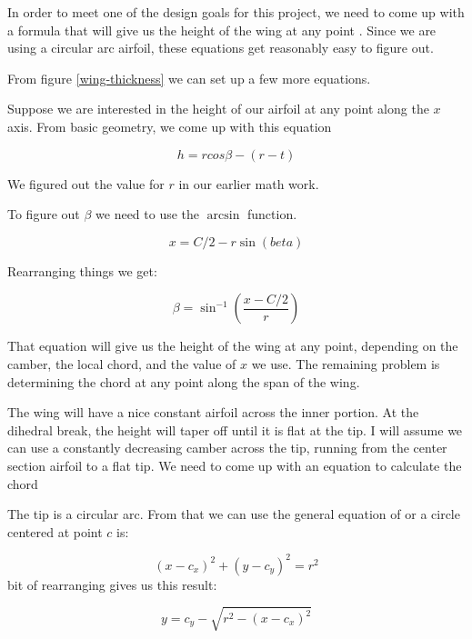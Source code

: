 In order to meet one of the design goals for this project, we need to come up
with a formula that will give us the height of the wing at any point . Since we
are using a circular arc airfoil, these equations get reasonably easy to figure
out.


From figure \ref{wing-thickness} we can set up a few more equations.


Suppose we are interested in the height of our airfoil at any point along the
{$x$} axis. From basic geometry, we come up with this equation

\begin{equation}
  h = r cos{\beta} - ( r - t )
\end{equation}

We figured out the value for {$r$} in our earlier math work.


To figure out {$\beta$} we need to use the $\arcsin$ function.

\begin{equation}
  x = C / 2 - r \sin(beta)
\end{equation}

Rearranging things we get:

\begin{equation}
  \beta = \sin^{-1} ( \frac{x - C/2}{r} )
\end{equation}

That equation will give us the height of the wing at any point, depending on
the camber, the local chord, and the value of {$x$} we use. The remaining
problem is determining the chord at any point along the span of the wing.

The wing will have a nice constant airfoil across the inner portion. At the
dihedral break, the height will taper off until it is flat at the tip. I will
assume we can use a constantly decreasing camber across the tip, running from
the center section airfoil to a flat tip. We need to come up with an equation
to calculate the chord

The tip is a circular arc. From that we can use the general equation of or a
circle centered at point {$c$} is:

\begin{equation}
  {(x - c_x)}^2 + {(y - c_y)}^2 = r^2
\end{equation}
 bit of rearranging gives us this result:

\begin{equation}
  y = c_y - \sqrt{r^2 - (x - c_x)^{2}}
\end{equation}

